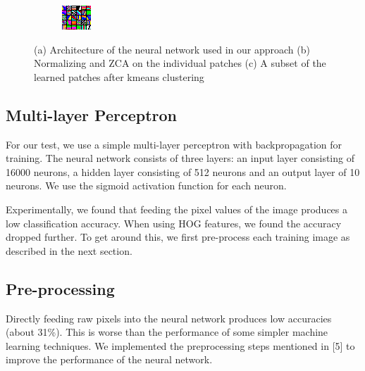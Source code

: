 \documentclass{article} %
\begin{document}
\begin{figure}
\begin{subfigure}{.1\linewidth}
            \includegraphics[width=\linewidth]{images/patch-clusters-few.png}
        \caption{}
        \end{subfigure}
        \caption{(a) Architecture of the neural network used in our approach (b) Normalizing and ZCA on the individual patches (c) A subset of the learned patches after kmeans clustering}
    \end{figure}
 

    \subsection{Multi-layer Perceptron} %
    \label{sub:Multi-layer Perceptron}
        For our test, we use a simple multi-layer perceptron with backpropagation for training. The neural network consists of three layers: an input layer consisting of 16000 neurons, a hidden layer consisting of 512 neurons and an output layer of 10 neurons. We use the sigmoid activation function for each neuron.

        Experimentally, we found that feeding the pixel values of the image produces a low classification accuracy. When using HOG features, we found the accuracy dropped further. To get around this, we first pre-process each training image as described in the next section.

    \subsection{Pre-processing} %
    \label{sub:Pre-processing}
        Directly feeding raw pixels into the neural network produces low accuracies (about 31\%). This is worse than the performance of some simpler machine learning techniques. We implemented the preprocessing steps mentioned in [5] to improve the performance of the neural network. 
\end{document}
